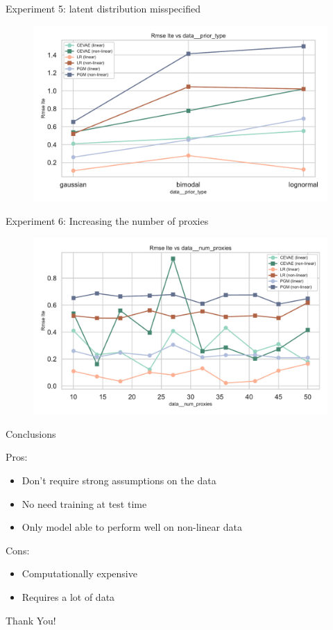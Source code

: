 \documentclass[10pt]{beamer}
\begin{document}
\begin{frame}{Experiment 5: latent distribution misspecified}
    \begin{figure}[H]
      \includegraphics[width=\textwidth]{images/MyRun_data__prior_type--rmse_ite.pdf}
    \end{figure}
\end{frame}

\begin{frame}{Experiment 6: Increasing the number of proxies}
    \begin{figure}[H]
      \includegraphics[width=\textwidth]{images/MyRun_data__num_proxies--rmse_ite.pdf}
    \end{figure}
\end{frame}

\begin{frame}{Conclusions}

  Pros:
  \begin{itemize}
    \item Don't require strong assumptions on the data
    \item No need training at test time
    \item Only model able to perform well on non-linear data
  \end{itemize}

  Cons:
  \begin{itemize}
    \item Computationally expensive
    \item Requires a lot of data
  \end{itemize}
\end{frame}

{
\begin{frame}[standout]
\thispagestyle{empty}
  {\LARGE Thank You!}
\end{frame}
}
\end{document}
